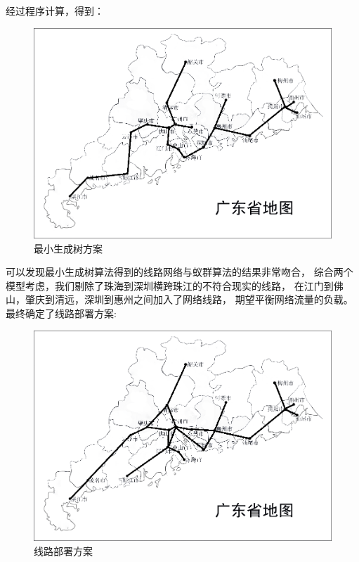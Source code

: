 \documentclass[UTF8,12pt]{ctexart}
\begin{document}
\begin{enumerate}
\begin{itemize}
          \end{itemize}\par
          经过程序计算，得到：
          \begin{figure}[H]
              \centering
              \includegraphics[scale=0.6]{ZXSCS.png}   %
              \caption{最小生成树方案}
          \end{figure}
\end{enumerate}

可以发现最小生成树算法得到的线路网络与蚁群算法的结果非常吻合，
综合两个模型考虑，我们剔除了珠海到深圳横跨珠江的不符合现实的线路，
在江门到佛山，肇庆到清远，深圳到惠州之间加入了网络线路，
期望平衡网络流量的负载。最终确定了线路部署方案:
\begin{figure}[H]
    \centering
    \includegraphics[scale=0.6]{over.png}   %
    \caption{线路部署方案}
\end{figure}
\end{document}
